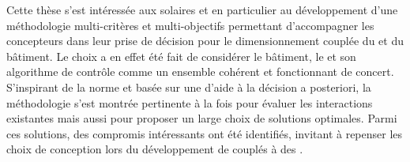 




Cette thèse s’est intéressée aux  solaires et en particulier au développement
d’une méthodologie multi-critères et multi-objectifs permettant d’accompagner les concepteurs dans leur prise de décision
pour le dimensionnement couplée du  et du bâtiment. Le choix a en
effet été fait de considérer le bâtiment, le  et son algorithme de contrôle comme
un ensemble cohérent et fonctionnant de concert. S’inspirant de la norme
 et basée sur une d’aide à la décision a posteriori, la méthodologie
s’est montrée pertinente à la fois pour évaluer les interactions existantes mais
aussi pour proposer un large choix de solutions optimales. Parmi ces solutions, des
compromis intéressants ont été identifiés, invitant à repenser les choix de conception
lors du développement de  couplés à des .

